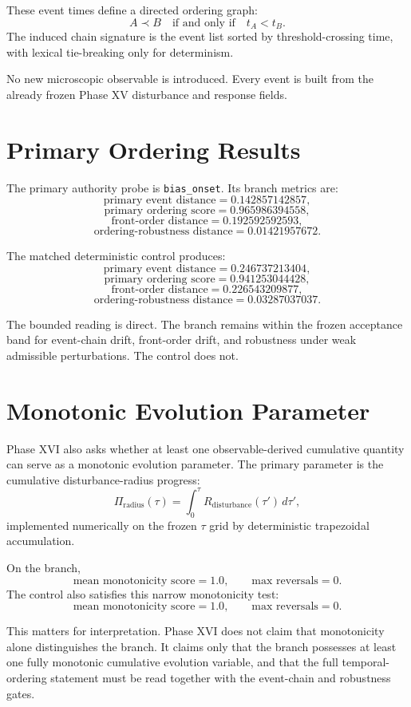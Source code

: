 \documentclass[11pt]{article}
\begin{document}
These event times define a directed ordering graph:
\[
A \prec B \quad \text{if and only if} \quad t_A < t_B.
\]
The induced chain signature is the event list sorted by threshold-crossing time, with lexical tie-breaking only for determinism.

No new microscopic observable is introduced. Every event is built from the already frozen Phase XV disturbance and response fields.

\section{Primary Ordering Results}

The primary authority probe is \texttt{bias\_onset}. Its branch metrics are:
\[
\text{primary event distance} = 0.142857142857,
\]
\[
\text{primary ordering score} = 0.965986394558,
\]
\[
\text{front-order distance} = 0.192592592593,
\]
\[
\text{ordering-robustness distance} = 0.01421957672.
\]

The matched deterministic control produces:
\[
\text{primary event distance} = 0.246737213404,
\]
\[
\text{primary ordering score} = 0.941253044428,
\]
\[
\text{front-order distance} = 0.226543209877,
\]
\[
\text{ordering-robustness distance} = 0.03287037037.
\]

The bounded reading is direct. The branch remains within the frozen acceptance band for event-chain drift, front-order drift, and robustness under weak admissible perturbations. The control does not.

\section{Monotonic Evolution Parameter}

Phase XVI also asks whether at least one observable-derived cumulative quantity can serve as a monotonic evolution parameter. The primary parameter is the cumulative disturbance-radius progress:
\[
\Pi_{\mathrm{radius}}(\tau)
=
\int_0^\tau R_{\mathrm{disturbance}}(\tau')\, d\tau',
\]
implemented numerically on the frozen $\tau$ grid by deterministic trapezoidal accumulation.

On the branch,
\[
\text{mean monotonicity score} = 1.0,
\qquad
\text{max reversals} = 0.
\]
The control also satisfies this narrow monotonicity test:
\[
\text{mean monotonicity score} = 1.0,
\qquad
\text{max reversals} = 0.
\]

This matters for interpretation. Phase XVI does not claim that monotonicity alone distinguishes the branch. It claims only that the branch possesses at least one fully monotonic cumulative evolution variable, and that the full temporal-ordering statement must be read together with the event-chain and robustness gates.
\end{document}
